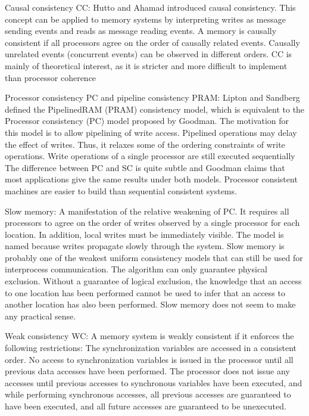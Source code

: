 \documentclass[a4paper,twoside]{scrbook}
\begin{document}
Causal consistency CC:
Hutto and Ahamad introduced causal consistency. This concept can be applied to memory systems by interpreting writes as message sending events and reads as message reading events. A memory is causally consistent if all processors agree on the order of causally related events. Causally unrelated events (concurrent events) can be observed in different orders.
CC is mainly of theoretical interest, as it is stricter and more difficult to implement than processor coherence
\par
\par
Processor consistency PC and pipeline consistency PRAM:
Lipton and Sandberg defined the PipelinedRAM (PRAM) consistency model, which is equivalent to the Processor consistency (PC) model proposed by Goodman.
The motivation for this model is to allow pipelining of write access. Pipelined operations may delay the effect of writes. Thus, it relaxes some of the ordering constraints of write operations. Write operations of a single processor are still executed sequentially
The difference between PC and SC is quite subtle and Goodman claims that most applications give the same results under both models. Processor consistent machines are easier to build than sequential consistent systems.
\par
Slow memory:
A manifestation of the relative weakening of PC. It requires all processors to agree on the order of writes observed by a single processor for each location. In addition, local writes must be immediately visible.
The model is named because writes propagate slowly through the system. Slow memory is probably one of the weakest uniform consistency models that can still be used for interprocess communication.
The algorithm can only guarantee physical exclusion. Without a guarantee of logical exclusion, the knowledge that an access to one location has been performed cannot be used to infer that an access to another location has also been performed. Slow memory does not seem to make any practical sense.
\par
Weak consistency WC:
A memory system is weakly consistent if it enforces the following restrictions:
The synchronization variables are accessed in a consistent order. No access to synchronization variables is issued in the processor until all previous data accesses have been performed.
The processor does not issue any accesses until previous accesses to synchronous variables have been executed, and while performing synchronous accesses, all previous accesses are guaranteed to have been executed, and all future accesses are guaranteed to be unexecuted.
\end{document}
